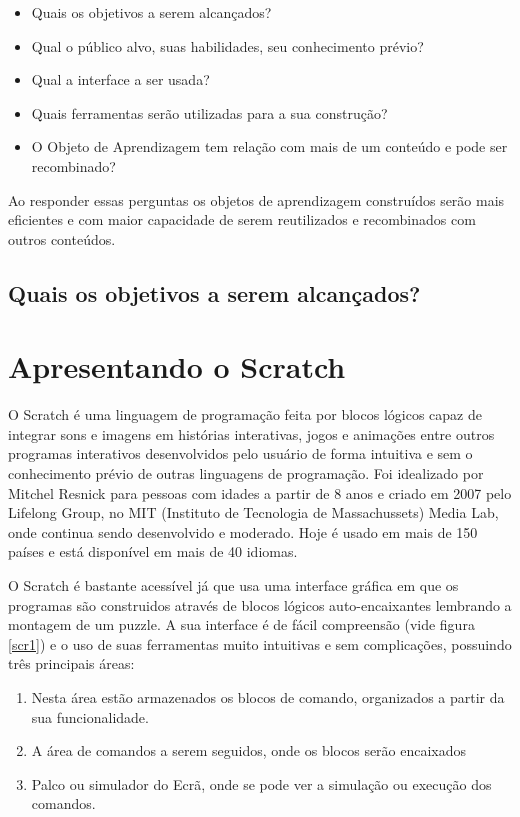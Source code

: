 \documentclass[12pt, openright, a4paper, brazil, english, french, spanish, bibjustif, openany, oneside]{abntex2}
\begin{document}
\begin{itemize}
\item Quais os objetivos a serem alcançados?
\item Qual o público alvo, suas habilidades, seu conhecimento prévio?
\item Qual a interface a ser usada?
\item Quais ferramentas serão utilizadas para a sua construção?
\item O Objeto de Aprendizagem tem relação com mais de um conteúdo e pode ser recombinado?
\end{itemize}

Ao responder essas perguntas os objetos de aprendizagem construídos serão mais eficientes e com maior capacidade de serem reutilizados e recombinados com outros conteúdos.

\section*{Quais os objetivos a serem alcançados?}





\chapter{Apresentando o Scratch}

 O Scratch é uma linguagem de programação feita por blocos lógicos capaz de integrar sons e imagens em histórias interativas, jogos e animações entre outros programas interativos desenvolvidos pelo usuário de forma intuitiva e sem o conhecimento prévio de outras linguagens de programação. Foi idealizado por Mitchel Resnick para pessoas com idades a partir de 8 anos e criado em 2007 pelo Lifelong Group, no MIT (Instituto de Tecnologia de Massachussets) Media Lab, onde continua sendo desenvolvido e moderado.  Hoje é usado em mais de 150 países e está disponível em mais de 40 idiomas.
 
 O Scratch é bastante acessível já que usa uma interface gráfica em que os programas são construidos através de blocos lógicos auto-encaixantes lembrando a montagem de um puzzle. A sua interface é de fácil compreensão (vide figura \ref{scr1}) e o uso de suas ferramentas muito intuitivas e sem complicações, possuindo três principais áreas:
 
\begin{enumerate}
\item Nesta área estão armazenados os blocos de comando, organizados a partir da sua funcionalidade.
\item A área de comandos a serem seguidos, onde os blocos serão encaixados
\item Palco ou simulador do Ecrã, onde se pode ver a simulação ou execução dos comandos.
\end{enumerate}
\end{document}
